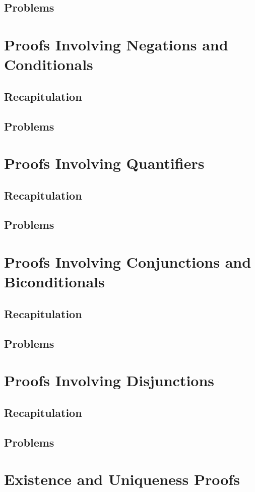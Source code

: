 \documentclass{report}
\begin{document}
        \subsection{Problems}
    \section{Proofs Involving Negations and Conditionals}
        \subsection{Recapitulation}
        \subsection{Problems}
    \section{Proofs Involving Quantifiers}
        \subsection{Recapitulation}
        \subsection{Problems}
    \section{Proofs Involving Conjunctions and Biconditionals}
        \subsection{Recapitulation}
        \subsection{Problems}
    \section{Proofs Involving Disjunctions}
        \subsection{Recapitulation}
        \subsection{Problems}
    \section{Existence and Uniqueness Proofs}
\end{document}
